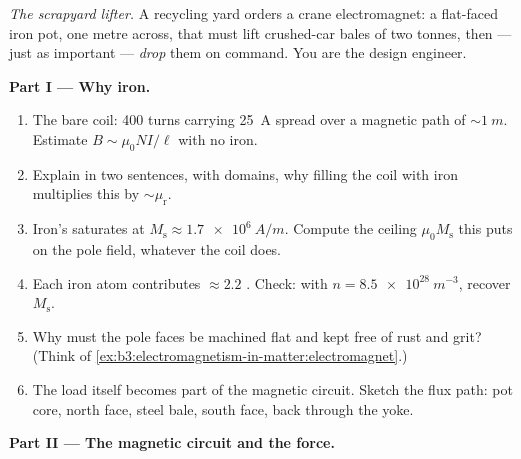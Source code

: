 \begin{problem}\label{pb:b3:electromagnetism-in-matter:1}
\emph{The scrapyard lifter.} A recycling yard orders a crane
electromagnet: a flat-faced iron pot, one metre across, that must
lift crushed-car bales of two tonnes, then --- just as important ---
\emph{drop} them on command. You are the design engineer.

\medskip\noindent\textbf{Part I --- Why iron.}

\begin{enumerate}
  \item The bare coil: 400 turns carrying \qty{25}{A} spread over
        a magnetic path of $\sim\qty{1}{m}$. Estimate $B \sim
        \mu_0NI/\ell$ with no iron.
  \item Explain in two sentences, with domains, why filling the
        coil with iron multiplies this by $\sim\mu_{\text{r}}$.
  \item Iron's  saturates at $M_{\text{s}} \approx
        \qty{1.7e6}{A/m}$. Compute the ceiling $\mu_0M_{\text{s}}$
        this puts on the pole field, whatever the coil does.
  \item Each iron atom contributes $\approx 2.2$ .
        Check: with $n = \qty{8.5e28}{m^{-3}}$, recover
        $M_{\text{s}}$.
  \item Why must the pole faces be machined flat and kept free of
        rust and grit? (Think of
        \cref{ex:b3:electromagnetism-in-matter:electromagnet}.)
  \item The load itself becomes part of the magnetic circuit.
        Sketch the flux path: pot core, north face, steel bale,
        south face, back through the yoke.
\end{enumerate}

\medskip\noindent\textbf{Part II --- The magnetic circuit and the force.}


\end{problem}
